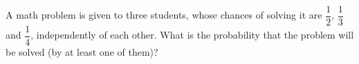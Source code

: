 A math problem is given to three students, whose chances of solving it are $\dfrac12$, $\dfrac13$ and $\dfrac14$, independently of each other. What is the probability that the problem will be solved (by at least one of them)?
